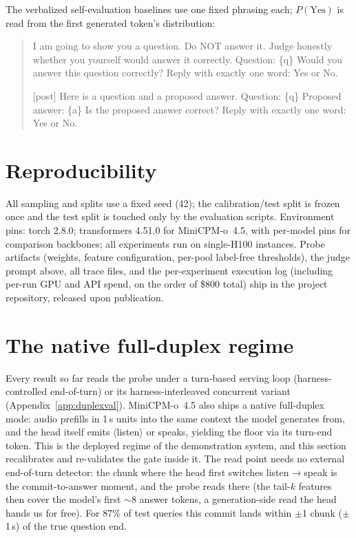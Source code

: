 The verbalized self-evaluation baselines use one fixed phrasing each;
$P(\text{Yes})$ is read from the first generated token's distribution:

\begin{quote}\small\ttfamily
[pre] I am going to show you a question. Do NOT answer it. Judge
honestly whether you yourself would answer it correctly.
Question: \{q\}
Would you answer this question correctly? Reply with exactly one word:
Yes or No.

[post] Here is a question and a proposed answer.
Question: \{q\}
Proposed answer: \{a\}
Is the proposed answer correct? Reply with exactly one word: Yes or No.
\end{quote}

\section{Reproducibility}
\label{app:repro}

All sampling and splits use a fixed seed (42); the calibration/test
split is frozen once and the test split is touched only by the
evaluation scripts. Environment pins: torch 2.8.0; transformers 4.51.0
for MiniCPM-o~4.5, with per-model pins for comparison backbones; all
experiments run on single-H100 instances. Probe artifacts (weights,
feature configuration, per-pool label-free thresholds), the judge
prompt above, all trace files, and the per-experiment execution log (including per-run GPU and API spend, on the order of \$800 total)
ship in the project repository, released upon publication.

\section{The native full-duplex regime}
\label{app:native}

Every result so far reads the probe under a turn-based serving
loop (harness-controlled end-of-turn) or its harness-interleaved
concurrent variant (Appendix~\ref{app:duplexval}). MiniCPM-o~4.5 also
ships a native full-duplex mode: audio prefills in 1\,s units into the
same context the model generates from, and the head itself emits
$\langle$listen$\rangle$ or speaks, yielding the floor via its
turn-end token. This is the deployed regime of the demonstration
system, and this section recalibrates and re-validates the gate inside
it. The read point needs no external end-of-turn detector: the chunk
where the head first switches listen$\to$speak is the
commit-to-answer moment, and the probe reads there (the tail-$k$
features then cover the model's first $\sim$8 answer tokens, a
generation-side read the head hands us for free). For 87\% of test
queries this commit lands within $\pm$1 chunk ($\pm$1\,s) of the true
question end.

